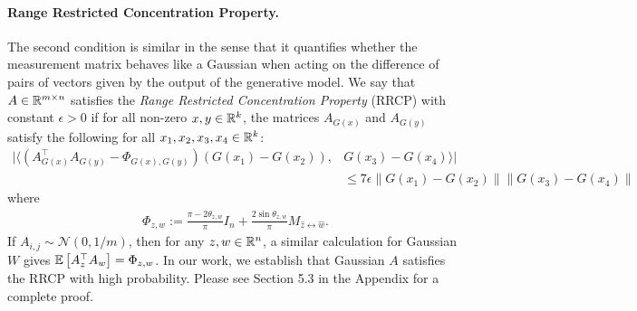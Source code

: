 \documentclass{article}
\begin{document}

\paragraph{Range Restricted Concentration Property.}
The second condition is similar in the sense that it quantifies whether the measurement matrix behaves like a Gaussian when acting on the difference of pairs of vectors given by the output of the generative model. We say that $A \in \mathbb{R}^{m \times n}$ satisfies the \textit{Range Restricted Concentration Property} (RRCP) with constant $\epsilon > 0$ if for all non-zero $x,y \in \mathbb{R}^{k}$, the matrices $A_{G(x)}$ and $A_{G(y)}$ satisfy the following for all $x_1,x_2,x_3,x_4 \in \mathbb{R}^k$: \begin{align*}
|\langle (A_{G(x)}^\top A_{G(y)} - \Phi_{G(x),G(y)})(G(x_1) - G(x_2)),& G(x_3) - G(x_4)\rangle | \\
&\leq 7 \epsilon \|G(x_1) - G(x_2)\|\|G(x_3) - G(x_4)\|
\end{align*} where \begin{align*}
\Phi_{z,w} := \frac{\pi - 2 \theta_{z,w}}{\pi}I_{n} + \frac{2\sin \theta_{z,w}}{\pi}M_{\hat{z} \leftrightarrow \hat{w}}.
\end{align*} If $A_{i,j} \sim \mathcal{N}(0,1/m)$, then for any $z,w \in \mathbb{R}^{n}$, a similar calculation for Gaussian $W$ gives $\operatorname{\mathbb{E}}\left[A_z^\top A_w\right] = \Phi_{z,w}$. In our work, we establish that Gaussian $A$ satisfies the RRCP with high probability. Please see Section 5.3 in the Appendix for a complete proof.


\end{document}
